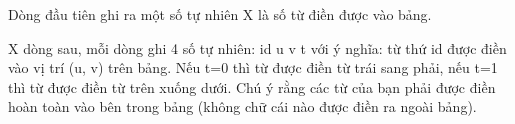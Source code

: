 Dòng đầu tiên ghi ra một số tự nhiên X là số từ điền được vào bảng.

X dòng sau, mỗi dòng ghi 4 số tự nhiên: id u v t với ý nghĩa: từ thứ id được điền vào vị trí (u, v) trên bảng. Nếu t=0 thì từ được điền từ trái sang phải, nếu t=1 thì từ được điền từ trên xuống dưới. Chú ý rằng các từ của bạn phải được điền hoàn toàn vào bên trong bảng (không chữ cái nào được điền ra ngoài bảng).